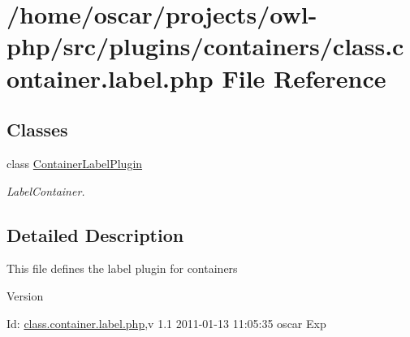 \section{/home/oscar/projects/owl-\/php/src/plugins/containers/class.container.label.php File Reference}
\label{class_8container_8label_8php}
\subsection*{Classes}
\begin{DoxyCompactItemize}
\item 
class \hyperlink{classContainerLabelPlugin}{ContainerLabelPlugin}
\begin{DoxyCompactList}\small\item\em LabelContainer. \item\end{DoxyCompactList}\end{DoxyCompactItemize}


\subsection{Detailed Description}
This file defines the label plugin for containers \begin{DoxyVersion}{Version}

\end{DoxyVersion}
\begin{DoxyParagraph}{Id:}
\hyperlink{class_8container_8label_8php}{class.container.label.php},v 1.1 2011-\/01-\/13 11:05:35 oscar Exp 
\end{DoxyParagraph}
